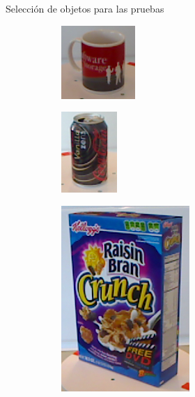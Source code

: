 \documentclass[]{beamer}
\begin{document}
\begin{frame}{Selección de objetos para las pruebas}
\begin{figure}
        \begin{subfigure}{0.3\textwidth}
            \centering
            \includegraphics[scale=0.7]{img/templates/coffee_mug_1.png}
        \end{subfigure}
        \begin{subfigure}{0.3\textwidth}
            \centering
            \includegraphics[scale=0.7]{img/templates/soda_can.png}
        \end{subfigure}
        \begin{subfigure}{0.3\textwidth}
            \centering
            \includegraphics[scale=0.35]{img/templates/cereal_box.png}
        \end{subfigure}
    \end{figure}
\end{frame}
\end{document}
